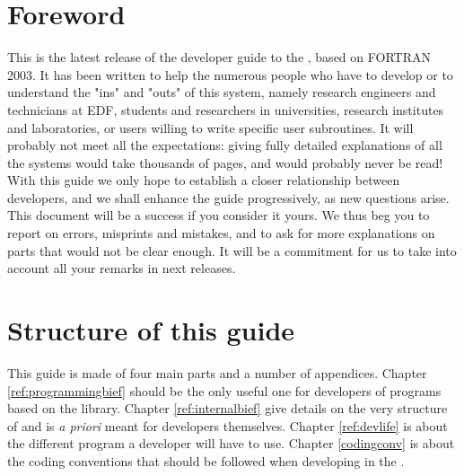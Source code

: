 %
\chapter{Foreword}
%
%
This is the latest release of the developer guide to the \telemacsystem, based
on FORTRAN 2003. It has been written to help the numerous people who have to
develop or to understand the "ins" and "outs" of this system, namely research
engineers and technicians at EDF, students and researchers in universities,
research institutes and laboratories, or users willing to write specific user
subroutines. It will probably not meet all the expectations: giving fully
detailed explanations of all the systems would take thousands of pages, and
would probably never be read! With this guide we only hope to establish a
closer relationship between developers, and we shall enhance the guide
progressively, as new questions arise. This document will be a success if you
consider it yours. We thus beg you to report on errors, misprints and mistakes,
and to ask for more explanations on parts that would not be clear enough. It
will be a commitment for us to take into account all your remarks in next
releases.
%
%
\chapter{Structure of this guide}
%
%
This guide is made of four main parts and a number of appendices. Chapter
\ref{ref:programmingbief} should be the only useful one for developers of
programs based on the \bief library.  Chapter \ref{ref:internalbief} give
details on the very structure of \bief and is \textit{a priori} meant for \bief
developers themselves. Chapter \ref{ref:devlife} is about the different program
a developer will have to use. Chapter \ref{codingconv} is about the coding
conventions that should be followed when developing in the \telemacsystem.
